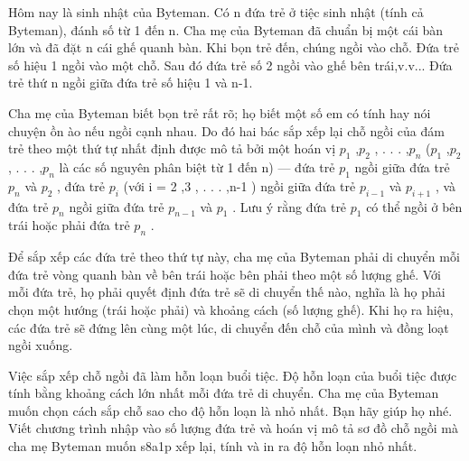 Hôm nay là sinh nhật của Byteman. Có n đứa trẻ ở tiệc sinh nhật (tính cả Byteman), đánh số từ 1 đến n. Cha mẹ của Byteman đã chuẩn bị một cái bàn lớn và đã đặt n cái ghế quanh bàn. Khi bọn trẻ đến, chúng ngồi vào chỗ. Đứa trẻ số hiệu 1 ngồi vào một chỗ. Sau đó đứa trẻ số 2 ngồi vào ghế bên trái,v.v... Đứa trẻ thứ n ngồi giữa đứa trẻ số hiệu 1 và n-1.  

   Cha mẹ của Byteman biết bọn trẻ rất rõ; họ biết một số em có tính hay nói chuyện ồn ào nếu ngồi cạnh nhau. Do đó hai bác sắp xếp lại chỗ ngồi của đám trẻ theo một thứ tự nhất định được mô tả bởi một hoán vị $p_{1}$   ,$p_{2}$   , . . . ,$p_{n}$   ($p_{1}$   ,$p_{2}$   , . . . ,$p_{n}$   là các số nguyên phân biệt từ 1 đến n) — đứa trẻ $p_{1}$   ngồi giữa đứa trẻ $p_{n}$   và $p_{2}$   , đứa trẻ $p_{i}$   (với i = 2 ,3 , . . . ,n-1 ) ngồi giữa đứa trẻ $p_{i-1}$   và $p_{i+1}$   , và đứa trẻ $p_{n}$   ngồi giữa đứa trẻ $p_{n-1}$   và $p_{1}$   . Lưu ý rằng đứa trẻ $p_{1}$   có thể ngồi ở bên trái hoặc phải đứa trẻ $p_{n}$   .  

   Để sắp xếp các đứa trẻ theo thứ tự này, cha mẹ của Byteman phải di chuyển mỗi đứa trẻ vòng quanh bàn về bên trái hoặc bên phải theo một số lượng ghế. Với mỗi đứa trẻ, họ phải quyết định đứa trẻ sẽ di chuyển thế nào, nghĩa là họ phải chọn một hướng (trái hoặc phải) và khoảng cách (số lượng ghế). Khi họ ra hiệu, các đứa trẻ sẽ đứng lên cùng một lúc, di chuyển đến chỗ của mình và đồng loạt ngồi xuống.  

   Việc sắp xếp chỗ ngồi đã làm hỗn loạn buổi tiệc. Độ hỗn loạn của buổi tiệc được tính bằng khoảng cách lớn nhất mỗi đứa trẻ di chuyển. Cha mẹ của Byteman muốn chọn cách sắp chỗ sao cho độ hỗn loạn là nhỏ nhất. Bạn hãy giúp họ nhé.
Viết chương trình nhập vào số lượng đứa trẻ và hoán vị mô tả sơ đồ chỗ ngồi mà cha mẹ Byteman muốn s8a1p xếp lại, tính và in ra độ hỗn loạn nhỏ nhất.